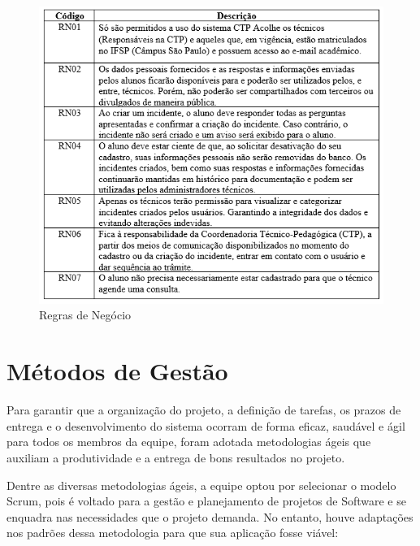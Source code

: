 \documentclass[12pt,a4paper]{article}
\begin{document}
\begin{figure}[H]
    \centering
     \includegraphics[width=15cm]{img8.png}
    \caption{Regras de Negócio}
    \label{p1}
\end{figure}

\section{Métodos de Gestão}
Para garantir que a organização do projeto, a definição de tarefas, os prazos de entrega e o desenvolvimento do sistema ocorram de forma eficaz, saudável e ágil para todos os membros da equipe, foram adotada metodologias ágeis que auxiliam a produtividade e a entrega de bons resultados no projeto.

Dentre as diversas metodologias ágeis, a equipe optou por selecionar o modelo Scrum, pois é voltado para a gestão e planejamento de projetos de Software e se enquadra nas necessidades que o projeto demanda. No entanto, houve adaptações nos padrões dessa metodologia para que sua aplicação fosse viável:
\end{document}
